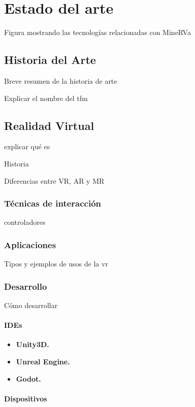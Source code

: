 \chapter{Estado del arte}
\label{chap:estado_arte}

Figura mostrando las tecnologías relacionadas con MineRVa

\section{Historia del Arte}

Breve resumen de la historia de arte

Explicar el nombre del tfm

\section{Realidad Virtual}

explicar qué es

Historia

Diferencias entre VR, AR y MR

\subsection{Técnicas de interacción}

controladores

\subsection{Aplicaciones}

Tipos y ejemplos de usos de la vr

\subsection{Desarrollo}

Cómo desarrollar

\subsubsection{IDEs}

\begin{itemize}
    \item \textbf{Unity3D.}
    \item \textbf{Unreal Engine.}
    \item \textbf{Godot.}
\end{itemize}

\subsubsection{Dispositivos}

